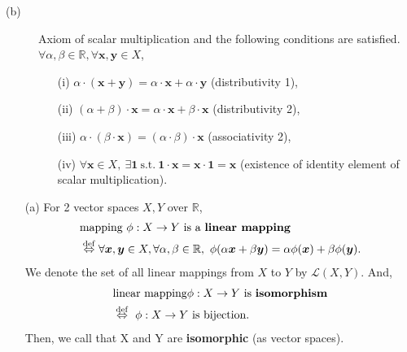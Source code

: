 \begin{frame}[fragile]
  \begin{defi}
    \begin{description}
      \item[(b)] Axiom of scalar multiplication and the following conditions are satisfied.
      $\forall\alpha, \beta\in\mathbb{R}, \forall\boldsymbol{x}, \boldsymbol{y}\in X$,
      \begin{enumerate}
        \item[(i)] $\alpha\cdot(\boldsymbol{x}+\boldsymbol{y}) = \alpha\cdot\boldsymbol{x}+\alpha\cdot\boldsymbol{y}$ (distributivity 1),
        \item[(ii)] $(\alpha +\beta)\cdot\boldsymbol{x} = \alpha\cdot\boldsymbol{x}+\beta\cdot\boldsymbol{x}$ (distributivity 2),
        \item[(iii)] $\alpha\cdot(\beta\cdot\boldsymbol{x}) = (\alpha\cdot\beta)\cdot\boldsymbol{x}$ (associativity 2),
        \item[(iv)] $\forall\boldsymbol{x}\in X,\ \exists\boldsymbol{1}\ \mbox{s.t.}\ \boldsymbol{1}\cdot\boldsymbol{x} = \boldsymbol{x}\cdot\boldsymbol{1} = \boldsymbol{x}$
        (existence of identity element of scalar multiplication).
      \end{enumerate}
    \end{description}
  \end{defi}
\end{frame}

\begin{frame}
  \begin{defi}
    \begin{enumerate}
      \item[(a)] For 2 vector spaces $X, Y$ over $\mathbb{R}$,
      \begin{align*}
        & \mbox{mapping}\  \phi:X\to Y\ \mbox{is a {\bf linear mapping}}\\
        & \overset{\mathrm{def}}{\Leftrightarrow}\forall\boldsymbol{x}, \boldsymbol{y}\in X, \forall\alpha, \beta\in\mathbb{R},\ \phi(\alpha\boldsymbol{x}+\beta\boldsymbol{y}) = \alpha\phi(\boldsymbol{x})+\beta\phi(\boldsymbol{y}).
      \end{align*}
      We denote the set of all linear mappings from $X$ to $Y$ by $\mathcal{L}(X, Y)$.
      And,
      \begin{align*}
      & \mbox{linear mapping} \phi: X\to Y\ \mbox{is {\bf isomorphism}}\\
      & \overset{\mathrm{def}}{\Leftrightarrow}\ \phi: X\to Y\ \mbox{is bijection}.\\
      \end{align*}
      Then, we call that X and Y are {\bf isomorphic} (as vector spaces).
    \end{enumerate}
  \end{defi}
\end{frame}

